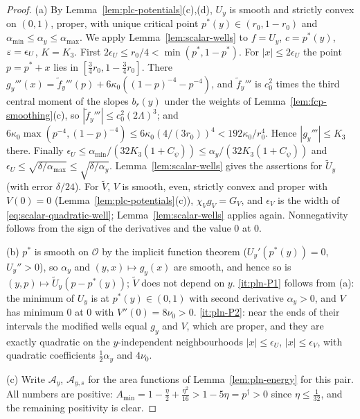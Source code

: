 \begin{proof}
(a) By Lemma~\ref{lem:plc-potentials}(c),(d), $U_y$ is smooth and strictly convex on $(0,1)$, proper, with unique
critical point $p^*(y)\in(r_0,1-r_0)$ and $\alpha_{\min}\le\alpha_y\le\alpha_{\max}$. We apply
Lemma~\ref{lem:scalar-wells} to $f=U_y$, $c=p^*(y)$, $\varepsilon=\epsilon_U$, $K=K_3$. First $2\epsilon_U\le r_0/4<\min(p^*,1-p^*)$.
For $|x|\le2\epsilon_U$ the point $p=p^*+x$ lies in $[\frac34r_0,1-\frac34r_0]$. There $g_y'''(x)=\tilde f_y'''(p)+
6\kappa_0((1-p)^{-4}-p^{-4})$, and $\tilde f_y'''$ is $c_0^2$ times the third central moment of the slopes $b_r(y)$ under
the weights of Lemma~\ref{lem:fcp-smoothing}(c), so $|\tilde f_y'''|\le c_0^2(2\Lambda)^3$; and
$6\kappa_0\max(p^{-4},(1-p)^{-4})\le6\kappa_0(4/(3r_0))^4<192\kappa_0/r_0^4$. Hence $|g_y'''|\le K_3$ there. Finally
$\epsilon_U\le\alpha_{\min}/(32K_3(1+C_\psi))\le\alpha_y/(32K_3(1+C_\psi))$ and $\epsilon_U\le\sqrt{\delta/\alpha_{\max}}\le
\sqrt{\delta/\alpha_y}$. Lemma~\ref{lem:scalar-wells} gives the assertions for $\widetilde U_y$ (with error $\delta/24$).
For $\widetilde V$, $V$ is smooth, even, strictly convex and proper with $V(0)=0$
(Lemma~\ref{lem:plc-potentials}(c)), $\chi_V g_V=G_V$, and $\epsilon_V$ is the width of
\eqref{eq:scalar-quadratic-well}; Lemma~\ref{lem:scalar-wells} applies again. Nonnegativity follows from the sign of
the derivatives and the value $0$ at $0$.

(b) $p^*$ is smooth on $\mathcal O$ by the implicit function theorem ($U_y'(p^*(y))=0$, $U_y''>0$), so $\alpha_y$ and
$(y,x)\mapsto g_y(x)$ are smooth, and hence so is $(y,p)\mapsto\widetilde U_y(p-p^*(y))$; $\widetilde V$ does not depend on
$y$. \ref{it:pln-P1} follows from (a): the minimum of $U_y$ is at $p^*(y)\in(0,1)$ with second derivative
$\alpha_y>0$, and $V$ has minimum $0$ at $0$ with $V''(0)=8\nu_0>0$. \ref{it:pln-P2}: near the ends of their
intervals the modified wells equal $g_y$ and $V$, which are proper, and they are exactly quadratic on the
$y$-independent neighbourhoods $|x|\le\epsilon_U$, $|x|\le\epsilon_V$, with quadratic coefficients
$\frac12\alpha_y$ and $4\nu_0$.

(c) Write $\mathcal A_y$, $\mathcal A_{y,s}$ for the area functions of Lemma~\ref{lem:pln-energy} for this pair. All
numbers are positive: $A_{\min}=1-\frac\eta2+\frac{\eta^2}{16}>1-5\eta=p^\dagger>0$ since $\eta\le\frac1{32}$, and the
remaining positivity is clear.


\end{proof}

